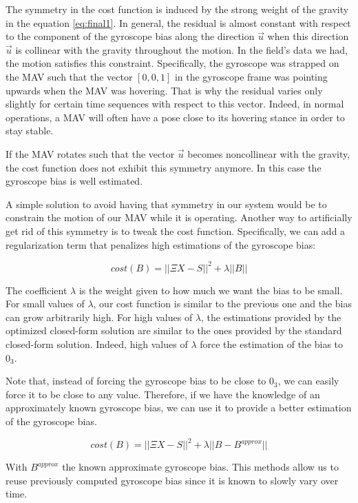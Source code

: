 \documentclass[letterpaper, 10 pt, conference]{ieeeconf}  %
\begin{document}
The symmetry in the cost function is induced by the strong weight of the gravity in the equation \ref{eq:final1}.
In general, the residual is almost constant with respect to the component of the gyroscope bias along the direction $\vec{u}$ when this direction $\vec{u}$ is collinear with the gravity throughout the motion.
In the field's data we had, the motion satisfies this constraint.
Specifically, the gyroscope was strapped on the MAV such that the vector $[0,0,1]$ in the gyroscope frame was pointing upwards when the MAV was hovering.
That is why the residual varies only slightly for certain time sequences with respect to this vector.
Indeed, in normal operations, a MAV will often have a pose close to its hovering stance in order to stay stable.

If the MAV rotates such that the vector $\vec{u}$ becomes noncollinear with the gravity, the cost function does not exhibit this symmetry anymore.
In this case the gyroscope bias is well estimated.

A simple solution to avoid having that symmetry in our system would be to constrain the motion of our MAV while it is operating.
Another way to artificially get rid of this symmetry is to tweak the cost function.
Specifically, we can add a regularization term that penalizes high estimations of the gyroscope bias:

\begin{equation}
cost(B) = ||\Xi X - S||^2 + \lambda ||B||
\end{equation}

The coefficient $\lambda$ is the weight given to how much we want the bias to be small.
For small values of $\lambda$, our cost function is similar to the previous one and the bias can grow arbitrarily high.
For high values of $\lambda$, the estimations provided by the optimized closed-form solution are similar to the ones provided by the standard closed-form solution.
Indeed, high values of $\lambda$ force the estimation of the bias to $0_3$.

Note that, instead of forcing the gyroscope bias to be close to $0_3$, we can easily force it to be close to any value.
Therefore, if we have the knowledge of an approximately known gyroscope bias, we can use it to provide a better estimation of the gyroscope bias.

\[
cost(B) = ||\Xi X - S||^2 + \lambda ||B - B^{approx}||
\]

With $B^{approx}$ the known approximate gyroscope bias.
This methods allow us to reuse previously computed gyroscope bias since it is known to slowly vary over time.
\end{document}
